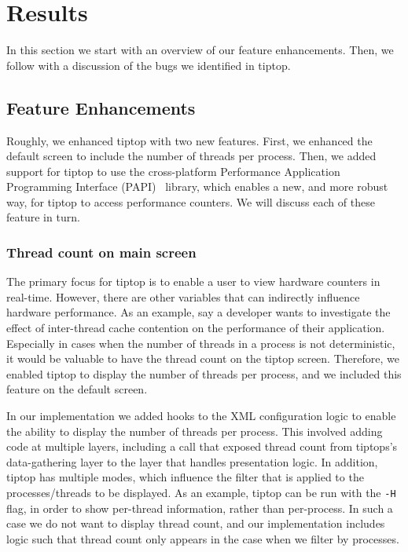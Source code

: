 \section{Results}
\label{sec:results}
In this section we start with an overview  of our feature enhancements. Then, we follow with a discussion of the bugs we identified in tiptop.

\subsection{Feature Enhancements}
Roughly, we enhanced tiptop with two new features.
First, we enhanced the default screen to include the number of threads per process.
Then, we added support for tiptop to use the cross-platform Performance Application Programming Interface (PAPI)~\cite{Mucci99papi:a} library, which enables a new, and more robust way, for tiptop to access performance counters.
We will discuss each of these feature in turn.

\subsubsection{Thread count on main screen}
The primary focus for tiptop is to enable a user to view hardware counters in real-time.
However, there are other variables that can indirectly influence hardware performance.
As an example, say a developer wants to investigate the effect of inter-thread cache contention on the performance of their application.
Especially in cases when the number of threads in a process is not deterministic, it would be valuable to have the thread count on the tiptop screen.
Therefore, we enabled tiptop to display the number of threads per process, and we included this feature on the default screen.

In our implementation we added hooks to the XML configuration logic to enable the ability to display the number of threads per process.
This involved adding code at multiple layers, including a call that exposed thread count from tiptops's data-gathering layer to the layer that handles presentation logic.
In addition, tiptop has multiple modes, which influence the filter that is applied to the processes/threads to be displayed.
As an example, tiptop can be run with the \texttt{-H} flag, in order to show per-thread information, rather than per-process.
In such a case we do not want to display thread count, and our implementation includes logic such that thread count only appears in the case when we filter by processes.

